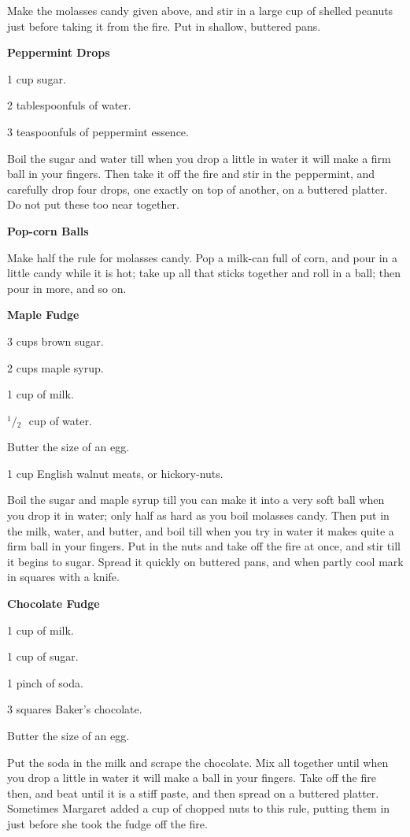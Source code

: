 \documentclass[11pt]{book}
\newcommand{\indpar}{\par\noindent\hspace*{\parindent}}
\newcommand{\ingredient}{\indpar}
\newcommand{\instruction}{\indpar}
\newcommand{\OneHalf}{\ensuremath{{}^1\!\!/\!{}_2\mbox{\ }}}
\newenvironment{RecipeTitle}{\medskip\begin{center}\large\bf }{\end{center}\smallskip}
\begin{document}
\instruction  Make the molasses candy given above, and stir in a large cup
of shelled peanuts just before taking it from the fire.  Put
in shallow, buttered pans.
\begin{RecipeTitle}
Peppermint Drops\label{peppermint_drops}
\end{RecipeTitle}
\ingredient  1 cup sugar.
\ingredient  2 tablespoonfuls of water.
\ingredient  3 teaspoonfuls of peppermint essence.
\instruction  Boil the sugar and water till when you drop a little in
water it will make a firm ball in your fingers.  Then take it
off the fire and stir in the peppermint, and carefully drop
four drops, one exactly on top of another, on a buttered
platter.  Do not put these too near together.
\begin{RecipeTitle}
Pop-corn Balls\label{popcorn_balls}
\end{RecipeTitle}
\instruction  Make half the rule for molasses candy.  Pop a milk-can full
of corn, and pour in a little candy while it is hot; take up
all that sticks together and roll in a ball; then pour in
more, and so on.
\begin{RecipeTitle}
Maple Fudge\label{maple_fudge}
\end{RecipeTitle}
\ingredient  3 cups brown sugar.
\ingredient  2 cups maple syrup.
\ingredient  1 cup of milk.
\ingredient  \OneHalf cup of water.
\ingredient  Butter the size of an egg.
\ingredient  1 cup English walnut meats, or hickory-nuts.
\instruction  Boil the sugar and maple syrup till you can make it into a
very soft ball when you drop it in water; only half as hard as
you boil molasses candy.  Then put in the milk, water, and
butter, and boil till when you try in water it makes quite a
firm ball in your fingers.  Put in the nuts and take off the
fire at once, and stir till it begins to sugar.  Spread it
quickly on buttered pans, and when partly cool mark in squares
with a knife.
\begin{RecipeTitle}
Chocolate Fudge\label{chocolate_fudge}
\end{RecipeTitle}
\ingredient  1 cup of milk.
\ingredient  1 cup of sugar.
\ingredient  1 pinch of soda.
\ingredient  3 squares Baker's chocolate.
\ingredient  Butter the size of an egg.
\instruction  Put the soda in the milk and scrape the chocolate.  Mix all
together until when you drop a little in water it will make a
ball in your fingers.  Take off the fire then, and beat until
it is a stiff paste, and then spread on a buttered platter.
Sometimes Margaret added a cup of chopped nuts to this rule,
putting them in just before she took the fudge off the fire.
\end{document}

